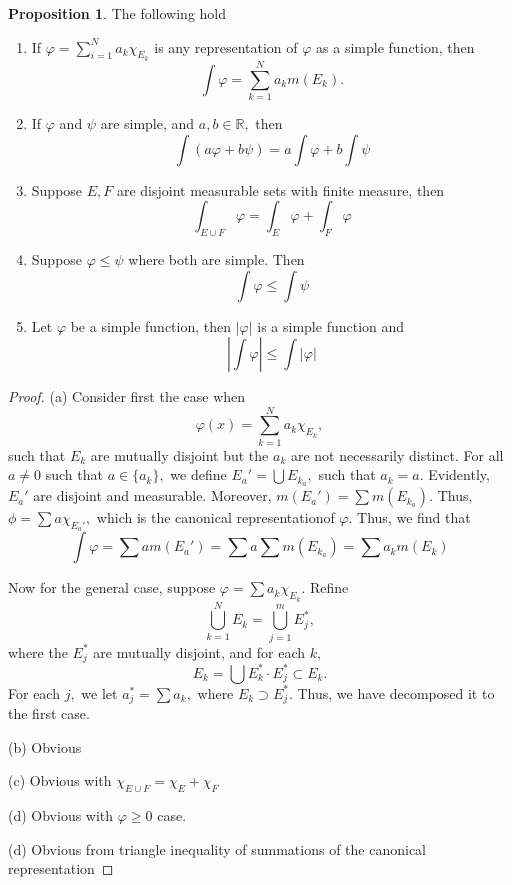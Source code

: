 \documentclass[10pt, oneside]{article}
\newcommand{\bbR}{\mathbb{R}}
\theoremstyle{definition}
\newtheorem{prop}{Proposition}
\begin{document}
\begin{prop}
The following hold
\begin{enumerate}
    \item If $\varphi = \sum_{i=1}^N a_k \chi_{E_k}$ is any representation of $\varphi$ as a simple function, then
    \[\int \varphi = \sum_{k=1}^N a_k m(E_k).\]
    \item If $\varphi$ and $\psi$ are simple, and $a,b \in \bbR,$ then 
    \[\int (a\varphi + b\psi) = a\int \varphi + b\int\psi\]
    \item Suppose $E, F$ are disjoint measurable sets with finite measure, then 
    \[\int_{E\cup F} \varphi = \int_E \varphi + \int_F \varphi\]
    \item Suppose $\varphi \leq \psi$ where both are simple. Then 
    \[\int \varphi \leq \int \psi\]
    \item Let $\varphi$ be a simple function, then $|\varphi|$ is a simple function and 
    \[\left|\int \varphi\right|\leq \int |\varphi|\]
\end{enumerate}
\end{prop}

\begin{proof}
    (a) Consider first the case when 
    \[\varphi(x) = \sum_{k=1}^N a_k \chi_{E_k},\] such that $E_k$ are mutually disjoint but the $a_k$ are not necessarily distinct. For all $a\neq 0$ such that $a\in \{a_k\},$ we define $E_a' = \bigcup E_{k_a},$ such that $a_k = a.$ Evidently, $E_a'$ are disjoint and measurable. Moreover, $m(E_a') = \sum m(E_{k_{a}}).$ Thus, $\phi = \sum a \chi_{E_a'},$ which is the canonical representationof $\varphi.$ Thus, we find that 
    \[\int \varphi = \sum a m(E_a') = \sum a \sum m(E_{k_a}) = \sum a_k m(E_k)\]

    Now for the general case, suppose $\varphi = \sum a_k \chi_{E_k}.$ Refine 
    \[\bigcup_{k=1}^N E_k = \bigcup_{j=1}^m E_j^*,\] where the $E_j^*$ are mutually disjoint, and for each $k,$ 
    \[E_k = \bigcup E_k^* \cdot E_j^* \subset E_k.\] For each $j,$ we let $a_j^* = \sum a_k,$ where $E_k \supset E_j^*.$ Thus, we have decomposed it to the first case.

    (b) Obvious

    (c) Obvious with $\chi_{E \cup F} = \chi_{E} + \chi_F$

    (d) Obvious with $\varphi \geq 0$ case.

    (d) Obvious from triangle inequality of summations of the canonical representation
\end{proof}
\end{document}
